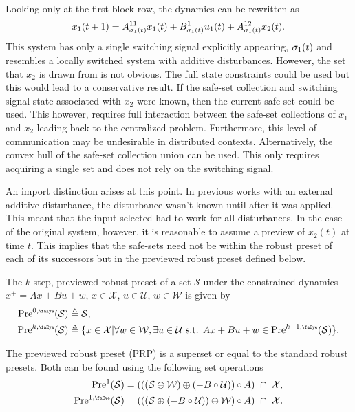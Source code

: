\documentclass[10pt,a4paper]{article}
\begin{document}
Looking only at the first block row, the dynamics can be rewritten as 
\begin{equation}
x_1(t+1)=A^{11}_{\ss_1(t)}x_1(t)+B^1_{\ss_1(t)}u_1(t)+A^{12}_{\ss_1(t)}x_2(t).
\end{equation}
This system has only a single switching signal explicitly appearing, $\ss_1(t)$ and resembles a locally switched system with additive disturbances. However, the set that $x_2$ is drawn from is not obvious. The full state constraints could be used but this would lead to a conservative result. If the safe-set collection and switching signal state associated with $x_2$ were known, then the current safe-set could be used. This however, requires full interaction between the safe-set collections of $x_1$ and $x_2$ leading back to the centralized problem. Furthermore, this level of communication may be undesirable in distributed contexts. Alternatively, the convex hull of the safe-set collection union can be used. This only requires acquiring a single set and does not rely on the switching signal. 

An import distinction arises at this point. In previous works with an external additive disturbance, the disturbance wasn't known until after it was applied. This meant that the input selected had to work for all disturbances. In the case of the original system, however, it is reasonable to assume a preview of $x_2(t)$ at time $t$. This implies that the safe-sets need not be within the robust preset of each of its successors but in the previewed robust preset defined below.
\begin{definition}
The $k$-step, previewed robust preset of a set $\mathcal{S}$ under the constrained dynamics $x^+=Ax+Bu+w$, $x\in\mathcal{X}$, $u\in\mathcal{U}$, $w\in\mathcal{W}$ is given by
\begin{align}
\text{Pre}^{0,\text{\tiny\faEye}}(\mathcal{S})&\triangleq\mathcal{S},\\
\text{Pre}^{k,\text{\tiny\faEye}}(\mathcal{S})&\triangleq\{x\in\mathcal{X}|\forall w\in\mathcal{W},\exists u\in\mathcal{U}\text{ s.t. }Ax+Bu+w\in\text{Pre}^{k-1,\text{\tiny\faEye}}(\mathcal{S})\}.
\end{align}
\end{definition}
The previewed robust preset (PRP) is a superset or equal to the standard robust presets. Both can be found using the following set operations
\begin{align}
\text{Pre}^{1}(\mathcal{S}) &= \left(\left(\left(\mathcal{S}\ominus\mathcal{W}\right)\oplus\left(-B\circ\mathcal{U}\right)\right)\circ A\right)\ \cap\ \mathcal{X},\\
\text{Pre}^{1,\text{\tiny\faEye}}(\mathcal{S}) &= \left(\left(\left(\mathcal{S}\oplus\left(-B\circ\mathcal{U}\right)\right)\ominus\mathcal{W}\right)\circ A\right)\ \cap\ \mathcal{X}.
\end{align}
\end{document}
